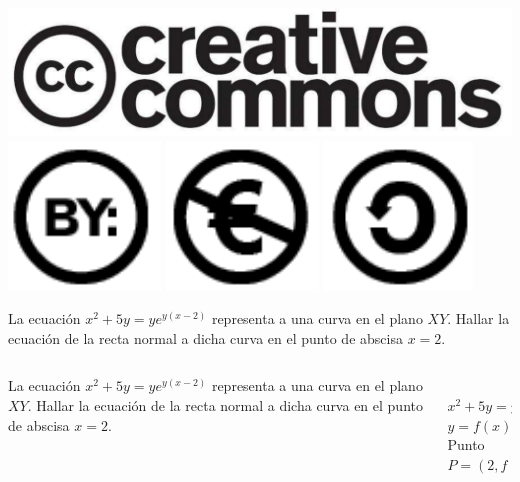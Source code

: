\documentclass[aspectratio=149,10pt,xcolor=dvipsnames,t]{beamer}
\begin{document}
\begin{frame}[c]
\begin{center}
\biskip
\includegraphics[scale=0.07]{img/cc-logo}
\includegraphics[scale=0.2]{img/cc-by}
\includegraphics[scale=0.2]{img/cc-e}
\includegraphics[scale=0.2]{img/cc-c}
\end{center}
\end{frame}

\begin{frame}[c]
\Large
La ecuación $x^2+5y=ye^{y(x-2)}$ representa a una curva en el plano $XY$.
Hallar la ecuación de la recta normal a dicha curva en el punto de abscisa $x=2$.
\end{frame}


\begin{frame}
\begin{columns}
\begin{column}[T]{0.7\textwidth}
La ecuación $x^2+5y=ye^{y(x-2)}$ representa a una curva en el plano $XY$.
Hallar la ecuación de la recta normal a dicha curva en el punto de abscisa $x=2$.
\end{column}
\begin{column}[T]{0.3\textwidth}
\\
$x^2+5y=ye^{y(x-2)}$\\
$y=f(x)$\\
Punto $P=(2,f(2))$
\end{column}
\end{columns}
\end{frame}
\end{document}
